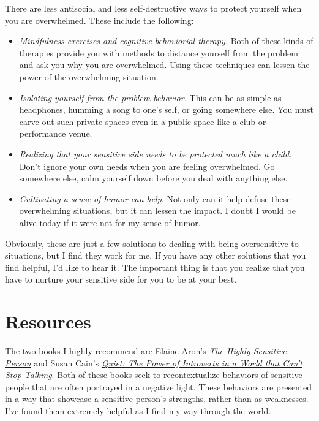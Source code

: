 \documentclass[
]{book}
\begin{document}
There are less antisocial and less self-destructive ways to protect yourself when you are
overwhelmed. These include the following:

\begin{itemize}
\item
  \emph{Mindfulness exercises and cognitive behaviorial therapy.} Both of these kinds of
  therapies provide you with methods to distance yourself from the problem and
  ask you why you are overwhelmed. Using these techniques can lessen the power of
  the overwhelming situation.
\item
  \emph{Isolating yourself from the problem behavior.} This can be as simple as headphones, humming a song to one's self, or going somewhere else. You must carve out such private spaces even in a public
  space like a club or performance venue.
\item
  \emph{Realizing that your sensitive side needs to be protected much like a child.} Don't
  ignore your own needs when you are feeling overwhelmed. Go somewhere else, calm
  yourself down before you deal with anything else.
\item
  \emph{Cultivating a sense of humor can help}. Not only can it help defuse these overwhelming
  situations, but it can lessen the impact. I doubt I would be alive today if it
  were not for my sense of humor.
\end{itemize}

Obviously, these are just a few solutions to dealing with being oversensitive to situations, but I find they work for me. If you have any other solutions that you find helpful, I'd like to
hear it. The important thing is that you realize that you have to nurture your
sensitive side for you to be at your best.

\hypertarget{resources}{%
\section{Resources}\label{resources}}

The two books I highly recommend are Elaine Aron's \href{https://hsperson.com/}{\emph{The Highly Sensitive Person}} and Susan Cain's \href{https://www.goodreads.com/book/show/8520610-quiet}{\emph{Quiet: The Power of Introverts in a World that Can't Stop Talking}}. Both of these books seek to recontextualize behaviors of
sensitive people that are often portrayed in a negative light. These behaviors
are presented in a way that showcase a sensitive person's strengths, rather
than as weaknesses. I've found them extremely helpful as I find my way through the world.
\end{document}
